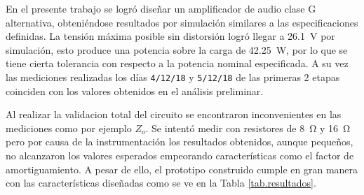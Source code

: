 




	En el presente trabajo se logró diseñar un amplificador de audio clase G alternativa, obteniéndose resultados por simulación similares a las especificaciones definidas. La tensión máxima posible sin distorsión logró llegar a \SI{26.1}{\volt} por simulación, esto produce una potencia sobre la carga de \SI{42.25}{\watt}, por lo que se tiene cierta tolerancia con respecto a la potencia nominal especificada. A su vez las mediciones realizadas los días \texttt{4/12/18} y \texttt{5/12/18} de las primeras 2 etapas coinciden con los valores obtenidos en el análisis preliminar.

	Al realizar la validacion total del circuito se encontraron inconvenientes en las mediciones como por ejemplo $Z_o$. Se intentó medir con resistores de \SI{8}{\ohm} y \SI{16}{\ohm} pero por causa de la instrumentación los resultados obtenidos, aunque pequeños, no alcanzaron los valores esperados empeorando características como el factor de amortiguamiento. A pesar de ello, el prototipo construido cumple en gran manera con las características diseñadas como se ve en la Tabla \ref{tab.resultados}.



